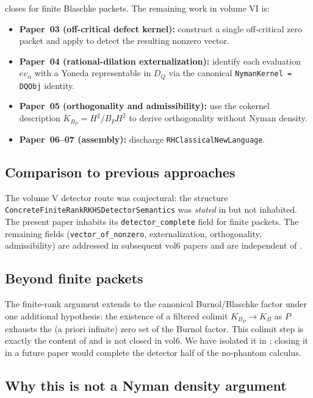 \documentclass[12pt]{article}
\theoremstyle{definition}
\theoremstyle{remark}
\newcommand{\HHH}{H^{2}}
\newcommand{\KB}{K_{B}}
\newcommand{\KBP}{K_{B_{P}}}
\begin{document}
 closes \cite[Paper~02 principal target]{Vol6KB}
for finite Blaschke packets. The remaining work in volume VI is:
\begin{itemize}\itemsep0pt
  \item \textbf{Paper~03 (off-critical defect kernel):} construct a single
        off-critical zero packet and apply 
        to detect the resulting nonzero vector.
  \item \textbf{Paper~04 (rational-dilation externalization):} identify each
        evaluation $ev_{\alpha}$ with a Yoneda representable in $D_{Q}$
        via the canonical \texttt{NymanKernel = DQObj} identity.
  \item \textbf{Paper~05 (orthogonality and admissibility):} use the
        cokernel description $\KBP=\HHH/B_{P}\HHH$ to derive orthogonality
        without Nyman density.
  \item \textbf{Paper~06--07 (assembly):} discharge \texttt{RHClassicalNewLanguage}.
\end{itemize}

\subsection{Comparison to previous approaches}

The volume V detector route was conjectural: the structure
\texttt{ConcreteFiniteRankRKHSDetectorSemantics} was \emph{stated} in
\cite{Vol5KB} but not inhabited. The present paper inhabits its
\texttt{detector\_complete} field for finite packets. The remaining
fields (\texttt{vector\_of\_nonzero}, externalization, orthogonality,
admissibility) are addressed in subsequent vol6 papers and are independent
of .

\subsection{Beyond finite packets}

The finite-rank argument extends to the canonical Burnol/Blaschke factor
under one additional hypothesis: the existence of a filtered colimit
$\KBP\to\KB$ as $P$ exhausts the (a priori infinite) zero set of the
Burnol factor. This colimit step is exactly the content of
\cite[RF-05]{Vol6KB} and is not closed in vol6. We have isolated it in
; closing it in a future paper would complete the
detector half of the no-phantom calculus.

\subsection{Why this is not a Nyman density argument}
\end{document}
